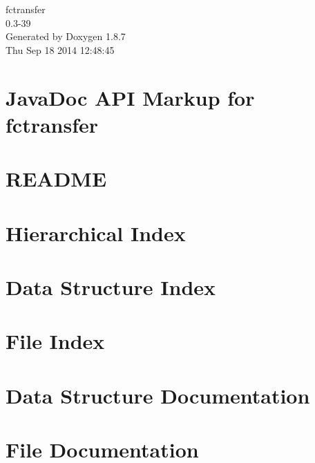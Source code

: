 \documentclass[twoside]{book}
\newcommand{\+}{\discretionary{\mbox{\scriptsize$\hookleftarrow$}}{}{}}
\newcommand{\clearemptydoublepage}{%
  \newpage{\pagestyle{empty}\cleardoublepage}%
}
\begin{document}
\begin{titlepage}
\vspace*{7cm}
\begin{center}%
{\Large fctransfer \\[1ex]\large 0.\+3-\/39 }\\
\vspace*{1cm}
{\large Generated by Doxygen 1.8.7}\\
\vspace*{0.5cm}
{\small Thu Sep 18 2014 12:48:45}\\
\end{center}
\end{titlepage}
\clearemptydoublepage
\tableofcontents
\clearemptydoublepage
{}

\chapter{Java\+Doc A\+P\+I Markup for fctransfer}
\label{index}
\chapter{R\+E\+A\+D\+M\+E}
\label{md_htdocs_README}

\chapter{Hierarchical Index}

\chapter{Data Structure Index}

\chapter{File Index}

\chapter{Data Structure Documentation}












\chapter{File Documentation}






\newpage
{}
{}
\printindex
\end{document}
